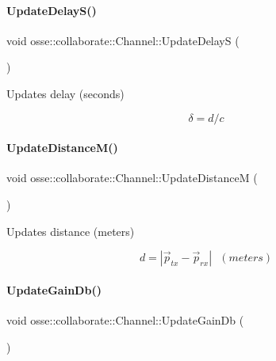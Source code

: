\paragraph{\texorpdfstring{Update\+Delay\+S()}{UpdateDelayS()}}
{\footnotesize\ttfamily void osse\+::collaborate\+::\+Channel\+::\+Update\+DelayS (\begin{DoxyParamCaption}{ }\end{DoxyParamCaption})\hspace{0.3cm}{\ttfamily [private]}}



Updates delay (seconds) 

\[ \delta = d / c \] \mbox{\label{classosse_1_1collaborate_1_1_channel_a89877e3e5c3cdfdd53b59001fea27b93}} 
\paragraph{\texorpdfstring{Update\+Distance\+M()}{UpdateDistanceM()}}
{\footnotesize\ttfamily void osse\+::collaborate\+::\+Channel\+::\+Update\+DistanceM (\begin{DoxyParamCaption}{ }\end{DoxyParamCaption})\hspace{0.3cm}{\ttfamily [private]}}



Updates distance (meters) 

\[ d = \left\lvert\vec{p}_{tx} - \vec{p}_{rx}\right\rvert ~~~ (meters) \] \mbox{\label{classosse_1_1collaborate_1_1_channel_a95ee1344e01272f80d638f3cde164e9c}} 
\paragraph{\texorpdfstring{Update\+Gain\+Db()}{UpdateGainDb()}}
{\footnotesize\ttfamily void osse\+::collaborate\+::\+Channel\+::\+Update\+Gain\+Db (\begin{DoxyParamCaption}{ }\end{DoxyParamCaption})\hspace{0.3cm}{\ttfamily [private]}}



